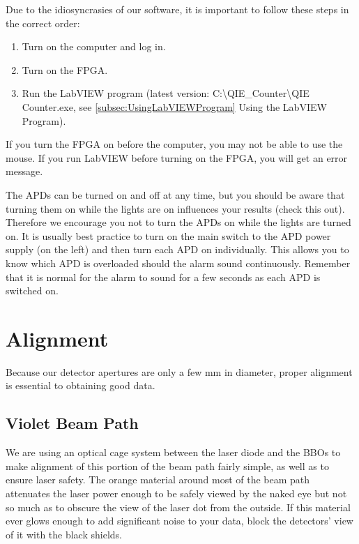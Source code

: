 \documentclass{../lab}
\begin{document}
\noindent Due to the idiosyncrasies of our software, it is important to follow these steps in the correct order:

\begin{enumerate}
    \item Turn on the computer and log in.

    \item Turn on the FPGA.

    \item Run the LabVIEW program (latest version: C:\textbackslash QIE\_Counter\textbackslash QIE Counter.exe, see \ref{subsec:UsingLabVIEWProgram} Using the LabVIEW Program).
\end{enumerate}

If you turn the FPGA on before the computer, you may not be able to use the mouse. If you run LabVIEW before turning on the FPGA, you will get an error message.

The APDs can be turned on and off at any time, but you should be aware that turning them on while the lights are on influences your results (check this out). Therefore we encourage you not to turn the APDs on while the lights are turned on. It is usually best practice to turn on the main switch to the APD power supply (on the left) and then turn each APD on individually. This allows you to know which APD is overloaded should the alarm sound continuously. Remember that it is normal for the alarm to sound for a few seconds as each APD is switched on.

\section{Alignment}
\label{sec:Alignment}

Because our detector apertures are only a few mm in diameter, proper alignment is essential to obtaining good data.

\subsection{Violet Beam Path}

We are using an optical cage system between the laser diode and the BBOs to make alignment of this portion of the beam path fairly simple, as well as to ensure laser safety. The orange material around most of the beam path attenuates the laser power enough to be safely viewed by the naked eye but not so much as to obscure the view of the laser dot from the outside. If this material ever glows enough to add significant noise to your data, block the detectors' view of it with the black shields.
\end{document}
